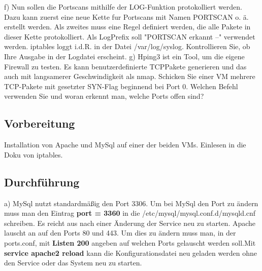 f) Nun sollen die Portscans mithilfe der LOG-Funktion protokolliert werden. Dazu kann zuerst eine neue Kette fur Portscans mit Namen PORTSCAN o. ä. erstellt werden. Als zweites muss eine Regel definiert werden, die alle Pakete in dieser Kette protokolliert. Als LogPrefix soll "PORTSCAN erkannt --" verwendet werden. iptables loggt i.d.R. in der Datei /var/log/syslog. Kontrollieren Sie, ob Ihre Ausgabe in der Logdatei erscheint.
g) Hping3 ist ein Tool, um die eigene Firewall zu testen. Es kann benutzerdefinierte TCPPakete generieren und das auch mit langsamerer Geschwindigkeit als nmap. Schicken Sie einer VM mehrere TCP-Pakete mit gesetzter SYN-Flag beginnend bei Port 0. Welchen Befehl verwenden Sie und woran erkennt man, welche Ports offen sind?

\subsection{Vorbereitung}
Installation von Apache und MySql auf einer der beiden VMs. Einlesen in die Doku von iptables.

\subsection{Durchführung}
a) MySql nutzt standardmäßig den Port 3306. Um bei MySql den Port zu ändern muss man den Eintrag \textbf{port = 3360} in die /etc/mysql/mysql.conf.d/mysqld.cnf schreiben. Es reicht aus nach einer Änderung der Service neu zu starten. Apache lauscht an auf den Ports 80 und 443. Um dies zu ändern muss man, in der ports.conf, mit \textbf{Listen 200} angeben auf welchen Ports gelauscht werden soll.Mit \textbf{service apache2 reload} kann die Konfigurationsdatei neu geladen werden ohne den Service oder das System neu zu starten.
